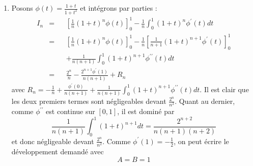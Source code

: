 \begin{enumerate}
\item  Posons $\phi (t)=\frac{1+t}{1+t^{2}}$ et int{\'e}grons par parties :
\begin{eqnarray*}
I_{n} &=&\left[ \frac{1}{n}(1+t)^{n}\phi (t)\right] _{0}^{1}-\frac{1}{n}%
\int_{0}^{1}(1+t)^{n}\phi ^{\prime }(t)dt \\
&=&\left[ \frac{1}{n}(1+t)^{n}\phi (t)\right]
_{0}^{1}-\frac{1}{n}\left[
\frac{1}{n+1}(1+t)^{n+1}\phi ^{\prime }(t)\right] _{0}^{1}\\
&\phantom{aaa}&+\frac{1}{n(n+1)}\int_{0}^{1}(1+t)^{n+1}\phi ^{\prime \prime }(t)dt \\
&=&\frac{2^{n}}{n}-\frac{2^{n+1}\phi ^{\prime }(1)}{n(n+1)}+R_{n}
\end{eqnarray*}
avec $R_{n}=-\frac{1}{n}+\frac{\phi ^{\prime }(0)}{n(n+1)}+\frac{1}{n(n+1)}%
\int_{0}^{1}(1+t)^{n+1}\phi ^{\prime \prime }(t)dt$. Il est clair
que les deux premiers termes sont n{\'e}gligeables devant
$\frac{2^{n}}{n^{2}}$. Quant au dernier, comme $\phi ^{\prime
\prime }$ est continue sur $\left[
0,1\right] $, il est domin{\'e} par
\[\frac{1}{n(n+1)}\int_{0}^{1}(1+t)^{n+1}dt=\frac{2^{n+2}}{n(n+1)(n+2)}\]
et donc n{\'e}gligeable devant $\frac{2^{n}}{n^{2}}$. Comme $\phi ^{\prime }(1)=-%
\frac{1}{2}$, on peut {\'e}crire le d{\'e}veloppement demand{\'e} avec
\[
A=B=1
\]
\end{enumerate}
